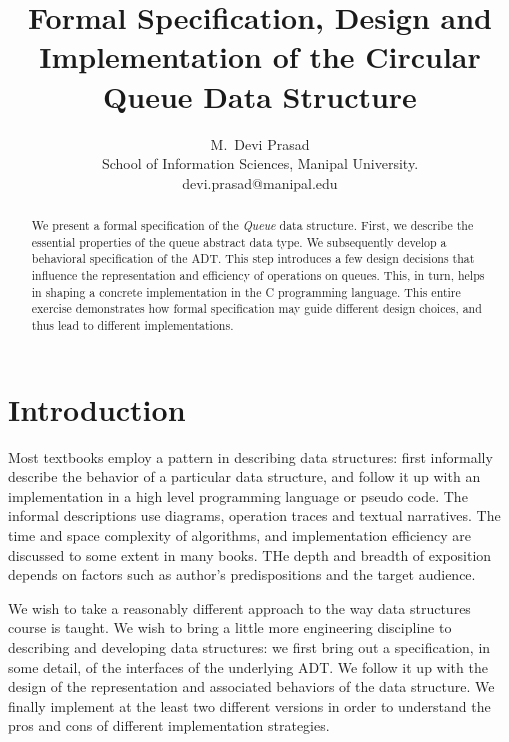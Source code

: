 \documentclass[10pt]{article}
\begin{document}
\title{Formal Specification, Design and Implementation of the Circular Queue Data Structure}
\author{
  M.\, Devi Prasad\\
  School of Information Sciences, Manipal University.\vspace*{6pt}\\
  devi.prasad@manipal.edu
 }
\date{}
\maketitle

\begin{abstract}
We present a formal specification of the \emph{Queue} data structure. First, we describe the essential properties of the queue abstract data type. We subsequently develop a behavioral specification of the ADT. This step introduces a few design decisions that influence the representation and efficiency of operations on queues. This, in turn, helps in shaping a concrete implementation in the C programming language. This entire exercise demonstrates how formal specification may guide different design choices, and thus lead to different implementations.
\end{abstract}

\section{Introduction}
Most textbooks employ a pattern in describing data structures: first informally describe the behavior of a particular data structure, and follow it up with an implementation in a high level programming language or pseudo code. The informal descriptions use diagrams, operation traces and textual narratives. The time and space complexity of algorithms, and implementation efficiency are discussed to some extent in many books. THe depth and breadth of exposition depends on factors such as author's predispositions and the target audience.

We wish to take a reasonably different approach to the way data structures course is taught. We wish to bring a little more engineering discipline to describing and developing data structures: we first bring out a specification, in some detail, of the interfaces of the underlying ADT. We follow it up with the design of the representation and associated behaviors of the data structure. We finally implement at the least two different versions in order to understand the pros and cons of different implementation strategies.
\end{document}
